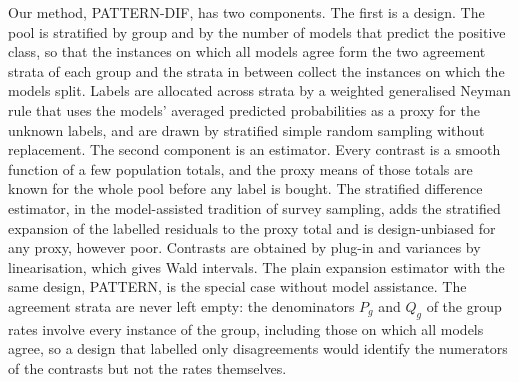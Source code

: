 Our method, PATTERN-DIF, has two components. The first is a design. The pool is stratified by group and by the number of models that predict the positive class, so that the instances on which all models agree form the two agreement strata of each group and the strata in between collect the instances on which the models split. Labels are allocated across strata by a weighted generalised Neyman rule that uses the models' averaged predicted probabilities as a proxy for the unknown labels, and are drawn by stratified simple random sampling without replacement. The second component is an estimator. Every contrast is a smooth function of a few population totals, and the proxy means of those totals are known for the whole pool before any label is bought. The stratified difference estimator, in the model-assisted tradition of survey sampling, adds the stratified expansion of the labelled residuals to the proxy total and is design-unbiased for any proxy, however poor. Contrasts are obtained by plug-in and variances by linearisation, which gives Wald intervals. The plain expansion estimator with the same design, PATTERN, is the special case without model assistance. The agreement strata are never left empty: the denominators $P_g$ and $Q_g$ of the group rates involve every instance of the group, including those on which all models agree, so a design that labelled only disagreements would identify the numerators of the contrasts but not the rates themselves.


